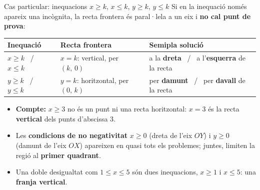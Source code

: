 \documentclass[11pt,a4paper]{article}
\begin{document}
\begin{propi}{Cas particular: inequacions $x\geq k$, $x\leq k$, $y\geq k$, $y\leq k$}
Si en la inequació només apareix una incògnita, la recta frontera és paral·lela a un eix i \textbf{no cal punt de prova}:
\begin{center}\small\renewcommand{\arraystretch}{1.25}\begin{tabular}{lll}\hline
\textbf{Inequació} & \textbf{Recta frontera} & \textbf{Semipla solució}\\\hline
$x\geq k$ \ / \ $x\leq k$ & $x=k$: vertical, per $(k,\,0)$ & a la \textbf{dreta} \ / \ a l'\textbf{esquerra} de la recta\\
$y\geq k$ \ / \ $y\leq k$ & $y=k$: horitzontal, per $(0,\,k)$ & per \textbf{damunt} \ / \ per \textbf{davall} de la recta\\\hline
\end{tabular}\end{center}
\begin{itemize}
\item \textbf{Compte:} $x\geq3$ no és un punt ni una recta horitzontal: $x=3$ és la recta \textbf{vertical} dels punts d'abscissa 3.
\item Les \textbf{condicions de no negativitat} $x\geq0$ (dreta de l'eix $OY$) i $y\geq0$ (damunt de l'eix $OX$) apareixen en quasi tots els problemes; juntes, limiten la regió al \textbf{primer quadrant}.
\item Una doble desigualtat com $1\leq x\leq5$ són dues inequacions, $x\geq1$ i $x\leq5$: una \textbf{franja vertical}.
\end{itemize}
\end{propi}
\end{document}
